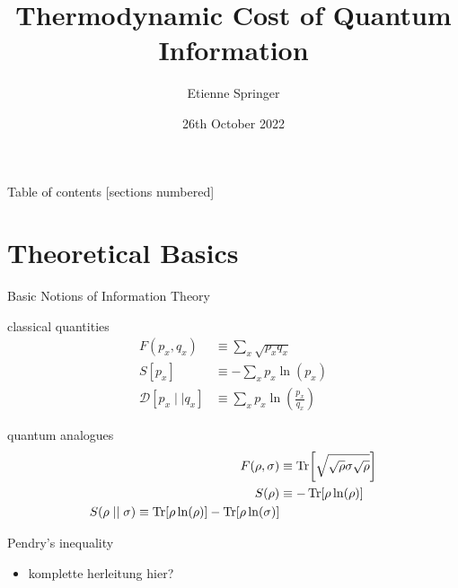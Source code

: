 \documentclass[10pt]{beamer}
\title{Thermodynamic Cost of Quantum Information}
\date{26th October 2022}
\author{Etienne Springer}
\institute{Institute for Theoretical Physics I}
\begin{document}
\maketitle

\begin{frame}{Table of contents}
    [sections numbered]
    \tableofcontents[hideallsubsections]
\end{frame}

\section[Theoretical Basics]{Theoretical Basics}

\begin{frame}{Basic Notions of Information Theory}
    \begin{minipage}[t]{.4\textwidth}
        classical quantities
        \begin{align*}
            F(p_x, q_x) &\equiv \sum\limits_x \sqrt{p_xq_x}\\
            S[p_x] &\equiv - \sum\limits_x p_x \ln(p_x) \\
            \mathcal{D}[p_x\mid\mid q_x] &\equiv \sum\limits_x p_x\ln(\frac{p_x}{q_x})
        \end{align*}
    \end{minipage}
    \begin{minipage}[t]{.5\textwidth}
        quantum analogues
        \begin{align*}
            F(\rho,\sigma) &\equiv \Tr[\sqrt{\sqrt{\rho}\sigma\sqrt{\rho}}]\\
            S(\rho) &\equiv -\Trace[\rho\ln(\rho)] \\
            S(\rho\mid\mid\sigma) \equiv \Trace[\rho\ln(\rho)] - \Trace[\rho\ln(\sigma)]
        \end{align*}
    \end{minipage}
\end{frame}

\begin{frame}{Pendry's inequality}
    \begin{itemize}
        \item komplette herleitung hier? \cite{BA_Pendry_1983}
    \end{itemize}
\end{frame}
\end{document}
